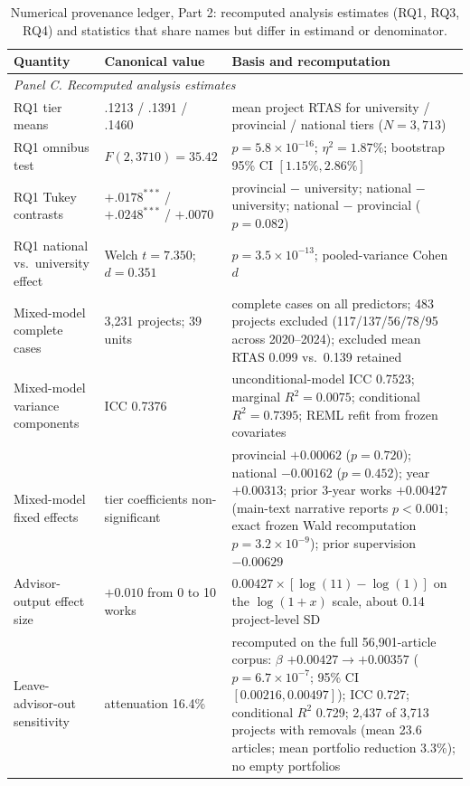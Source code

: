 
\begin{table}[H]
\centering
\caption{Numerical provenance ledger, Part 2: recomputed analysis estimates (RQ1, RQ3, RQ4) and statistics that share names but differ in estimand or denominator.}
\label{tab:s5}
\scriptsize
\begin{tabular}{p{1.55in}p{1.05in}p{3.15in}}
\toprule
\textbf{Quantity} & \textbf{Canonical value} & \textbf{Basis and recomputation}\\
\midrule
\multicolumn{3}{l}{\textit{Panel C. Recomputed analysis estimates}}\\
\midrule
RQ1 tier means & .1213 / .1391 / .1460 & mean project RTAS for university / provincial / national tiers ($N=3{,}713$)\\
RQ1 omnibus test & $F(2,3710)=35.42$ & $p=5.8\times10^{-16}$; $\eta^2=1.87\%$; bootstrap 95\% CI $[1.15\%,2.86\%]$\\
RQ1 Tukey contrasts & $+.0178^{***}$ / $+.0248^{***}$ / $+.0070$ & provincial $-$ university; national $-$ university; national $-$ provincial ($p=0.082$)\\
RQ1 national vs.\ university effect & Welch $t=7.350$; $d=0.351$ & $p=3.5\times10^{-13}$; pooled-variance Cohen $d$\\
Mixed-model complete cases & 3,231 projects; 39 units & complete cases on all predictors; 483 projects excluded (117/137/56/78/95 across 2020--2024); excluded mean RTAS 0.099 vs.\ 0.139 retained\\
Mixed-model variance components & ICC 0.7376 & unconditional-model ICC 0.7523; marginal $R^2=0.0075$; conditional $R^2=0.7395$; REML refit from frozen covariates\\
Mixed-model fixed effects & tier coefficients non-significant & provincial $+0.00062$ ($p=0.720$); national $-0.00162$ ($p=0.452$); year $+0.00313$; prior 3-year works $+0.00427$ (main-text narrative reports $p<0.001$; exact frozen Wald recomputation $p=3.2\times10^{-9}$); prior supervision $-0.00629$\\
Advisor-output effect size & $+0.010$ from 0 to 10 works & $0.00427\times[\log(11)-\log(1)]$ on the $\log(1+x)$ scale, about 0.14 project-level SD\\
Leave-advisor-out sensitivity & attenuation 16.4\% & recomputed on the full 56,901-article corpus: $\beta$ $+0.00427\to+0.00357$ ($p=6.7\times10^{-7}$; 95\% CI $[0.00216,0.00497]$); ICC 0.727; conditional $R^2$ 0.729; 2,437 of 3,713 projects with removals (mean 23.6 articles; mean portfolio reduction 3.3\%); no empty portfolios\\

\end{tabular}
\end{table}
